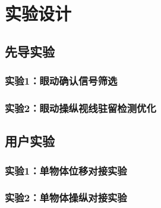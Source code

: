 \chapter{实验设计}

\section{先导实验}

\subsection{实验1：眼动确认信号筛选}

\subsection{实验2：眼动操纵视线驻留检测优化}

\section{用户实验}

\subsection{实验1：单物体位移对接实验}

\subsection{实验2：单物体操纵对接实验}
